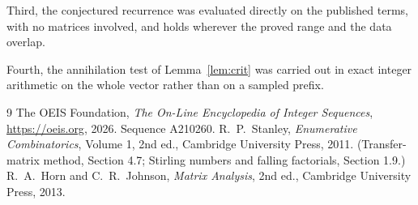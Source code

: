 \documentclass[11pt,a4paper]{article}
\theoremstyle{plain}
\theoremstyle{definition}
\begin{document}
Third, the conjectured recurrence was evaluated directly on the published terms, with no
matrices involved, and holds wherever the proved range and the data overlap.

Fourth, the annihilation test of Lemma~\ref{lem:crit} was carried out in exact integer
arithmetic on the whole vector rather than on a sampled prefix.

\begin{thebibliography}{9}
 The OEIS Foundation, \emph{The On-Line Encyclopedia of Integer
Sequences}, \url{https://oeis.org}, 2026. Sequence A210260.
 R.~P.~Stanley, \emph{Enumerative Combinatorics}, Volume 1, 2nd ed.,
Cambridge University Press, 2011. (Transfer-matrix method, Section 4.7; Stirling numbers and
falling factorials, Section 1.9.)
 R.~A.~Horn and C.~R.~Johnson, \emph{Matrix Analysis}, 2nd ed., Cambridge
University Press, 2013.
\end{thebibliography}
\end{document}

